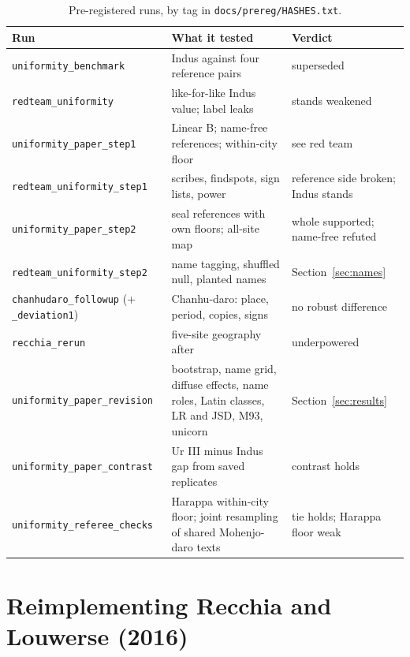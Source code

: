 \documentclass[11pt,a4paper]{article}
\begin{document}
\begin{table}[h]
\centering
\small
\caption{Pre-registered runs, by tag in \nolinkurl{docs/prereg/HASHES.txt}.}
\label{tab:prereg}
\begin{tabularx}{\textwidth}{lXl}
\toprule
Run & What it tested & Verdict \\
\midrule
\texttt{uniformity\_benchmark} & Indus against four reference pairs & superseded \\ %
\texttt{redteam\_uniformity} & like-for-like Indus value; label leaks & stands weakened \\ %
\texttt{uniformity\_paper\_step1} & Linear B; name-free references; within-city floor & see red team \\ %
\texttt{redteam\_uniformity\_step1} & scribes, findspots, sign lists, power & reference side broken; Indus stands \\ %
\texttt{uniformity\_paper\_step2} & seal references with own floors; all-site map & whole supported; name-free refuted \\ %
\texttt{redteam\_uniformity\_step2} & name tagging, shuffled null, planted names & Section~\ref{sec:names} \\ %
\texttt{chanhudaro\_followup} (+\,\texttt{\_deviation1}) & Chanhu-daro: place, period, copies, signs & no robust difference \\ %
\texttt{recchia\_rerun} & five-site geography after \citet{recchia2016} & underpowered \\ %
\texttt{uniformity\_paper\_revision} & bootstrap, name grid, diffuse effects, name roles, Latin classes, LR and JSD, M93, unicorn & Section~\ref{sec:results} \\ %
\texttt{uniformity\_paper\_contrast} & Ur III minus Indus gap from saved replicates & contrast holds \\ %
\texttt{uniformity\_referee\_checks} & Harappa within-city floor; joint resampling of shared Mohenjo-daro texts & tie holds; Harappa floor weak \\ %
\bottomrule
\end{tabularx}
\end{table}

\section{Reimplementing Recchia and Louwerse (2016)}
\label{app:recchia}
\end{document}
